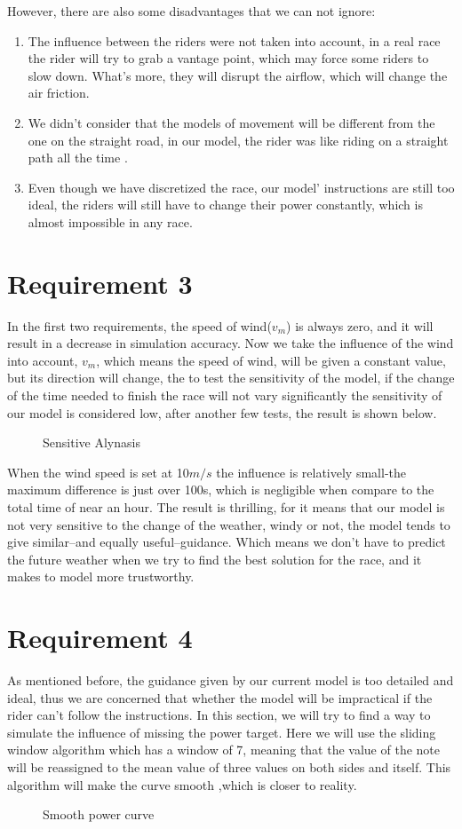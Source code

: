 \documentclass[12pt]{article}
\begin{document}
However, there are also some disadvantages that we can not ignore:
\begin{enumerate}
    \item The influence between the riders were not taken into account, in a real race the rider will try to grab a vantage point, which may force some riders to
          slow down. What's more, they will disrupt the airflow, which will change the air friction.%
    \item We didn't consider that the models of movement will be different from the one on the straight road, in our model, the rider was like riding on a straight path
          all the time
          .%
    \item Even though we have discretized the race, our model' instructions are still too ideal, the riders will still have to change their power constantly, which is
          almost impossible in any race. %
\end{enumerate}
\section{Requirement 3}
In the first two requirements, the speed of wind($v_m$) is always zero, and it will result in a decrease in simulation accuracy.
Now we take the influence of the wind into account,  $v_m$, which means the speed of wind, will be given a constant value, but its direction will change, the
to test the sensitivity of the model, if the change of the time needed to finish the race will not vary significantly the sensitivity of our model
is considered low, after another few tests, the result is shown below.
\begin{figure}
    \centering
    
    \caption{Sensitive Alynasis}
\end{figure}
When the wind speed is set at 10$m/s$ the influence is relatively small-the maximum difference is just over 100s, which is negligible when compare to the total time of
near an hour. The result is thrilling, for it means that our model is not very sensitive to the change of the weather, windy or not, the model tends to give similar--and
equally useful--guidance. Which means we don't have to predict the future weather when we try to find the best solution for the race, and it makes to model more trustworthy.
\section{Requirement 4}
As mentioned before, the guidance given by our current model is too detailed and ideal, thus we are concerned that whether the model will be impractical if the rider can't
follow the instructions. In this section, we will try to find a way to simulate the influence of missing the power target. Here we will use the sliding window algorithm which
has a window of 7, meaning that the value of the note will be reassigned to the mean value of three values on both sides and itself. This algorithm will make the curve smooth
,which is closer to reality.
\begin{figure}
    \centering
    
    \caption{Smooth power curve}
\end{figure}
\end{document}
